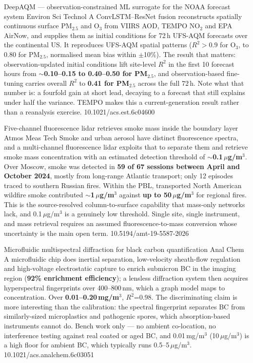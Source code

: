 \documentclass[10pt]{article}
\begin{document}
{DeepAQM --- observation-constrained ML surrogate for the NOAA forecast system}
{Environ Sci Technol}
{A ConvLSTM--ResNet fusion reconstructs spatially continuous surface PM$_{2.5}$ and O$_3$
from VIIRS AOD, TEMPO NO$_2$ and EPA AirNow, and supplies them as initial conditions for
72\,h UFS-AQM forecasts over the continental US. It reproduces UFS-AQM spatial patterns
($R^2>0.9$ for O$_3$, to 0.80 for PM$_{2.5}$, normalised mean bias within $\pm$10\%).
The result that matters: observation-updated initial conditions lift site-level $R^2$ in
the first 10 forecast hours from \textbf{$\sim$0.10--0.15 to 0.40--0.50 for PM$_{2.5}$},
and observation-based fine-tuning carries overall $R^2$ to \textbf{0.41 for PM$_{2.5}$}
across the full 72\,h. Note what that number is: a fourfold gain at short lead, decaying
to a forecast that still explains under half the variance. TEMPO makes this a
current-generation result rather than a reanalysis exercise.}
{10.1021/acs.est.6c04600}

{Five-channel fluorescence lidar retrieves smoke mass inside the boundary layer}
{Atmos Meas Tech}
{Smoke and urban aerosol have distinct fluorescence spectra, and a multi-channel
fluorescence lidar exploits that to separate them and retrieve smoke mass concentration
with an estimated detection threshold of \textbf{$\sim$0.1\,$\mu$g/m$^3$}. Over Moscow,
smoke was detected in \textbf{59 of 67 sessions between April and October 2024}, mostly
from long-range Atlantic transport; only 12 episodes traced to southern Russian fires.
Within the PBL, transported North American wildfire smoke contributed
\textbf{$\sim$1\,$\mu$g/m$^3$} against \textbf{up to 50\,$\mu$g/m$^3$} for regional fires.
This is the source-resolved column-to-surface capability that mass-only networks lack, and
0.1\,$\mu$g/m$^3$ is a genuinely low threshold. Single site, single instrument, and mass
retrieval requires an assumed fluorescence-to-mass conversion whose uncertainty is the
main open term.}
{10.5194/amt-19-5587-2026}

{Microfluidic multispectral diffraction for black carbon quantification}
{Anal Chem}
{A microfluidic chip does inertial separation, low-velocity sheath-flow regulation and
high-voltage electrostatic capture to enrich submicron BC in the imaging region
(\textbf{92\% enrichment efficiency}); a lensless diffraction system then acquires
hyperspectral fingerprints over 400--800\,nm, which a graph model maps to concentration.
Over \textbf{0.01--0.20\,mg/m$^3$}, $R^2$=0.98. The discriminating claim is more
interesting than the calibration: the spectral fingerprint separates BC from
similarly-sized microplastics and pathogenic spores, which absorption-based
instruments cannot do. Bench work only --- no ambient co-location, no interference testing
against real coated or aged BC, and 0.01\,mg/m$^3$ (10\,$\mu$g/m$^3$) is a high floor for
ambient BC, which typically runs 0.5--5\,$\mu$g/m$^3$.}
{10.1021/acs.analchem.6c03051}
\end{document}
